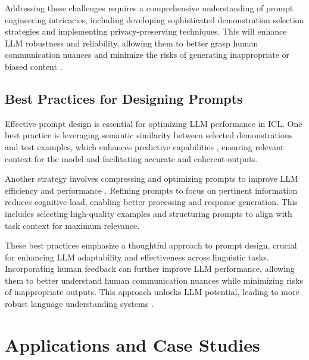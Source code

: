 Addressing these challenges requires a comprehensive understanding of prompt engineering intricacies, including developing sophisticated demonstration selection strategies and implementing privacy-preserving techniques. This will enhance LLM robustness and reliability, allowing them to better grasp human communication nuances and minimize the risks of generating inappropriate or biased content \cite{moradi2024exploringlandscapelargelanguage,he2024usingnaturallanguageexplanations}.

\subsection{Best Practices for Designing Prompts} \label{subsec:Best Practices for Designing Prompts}

Effective prompt design is essential for optimizing LLM performance in ICL. One best practice is leveraging semantic similarity between selected demonstrations and test examples, which enhances predictive capabilities \cite{margatina2023active}, ensuring relevant context for the model and facilitating accurate and coherent outputs.

Another strategy involves compressing and optimizing prompts to improve LLM efficiency and performance \cite{chang2024efficientpromptingmethodslarge}. Refining prompts to focus on pertinent information reduces cognitive load, enabling better processing and response generation. This includes selecting high-quality examples and structuring prompts to align with task context for maximum relevance.

These best practices emphasize a thoughtful approach to prompt design, crucial for enhancing LLM adaptability and effectiveness across linguistic tasks. Incorporating human feedback can further improve LLM performance, allowing them to better understand human communication nuances while minimizing risks of inappropriate outputs. This approach unlocks LLM potential, leading to more robust language understanding systems \cite{parry2024incontextlearningori,moradi2024exploringlandscapelargelanguage,he2024usingnaturallanguageexplanations}.











\section{Applications and Case Studies} \label{sec:Applications and Case Studies}

